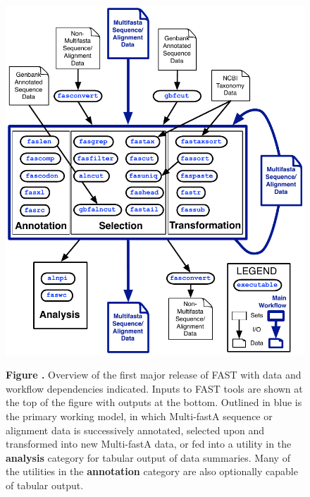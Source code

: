 \documentclass{frontiersSCNS} %
\begin{document}
\begin{figure}
\begin{center}
\includegraphics[width=4.5in]{FAST_v8}%
\end{center}
\textbf{\label{fig:01} Figure
  .}{ Overview of the first major release of FAST with
  data and workflow dependencies indicated.  Inputs to FAST tools are
  shown at the top of the figure with outputs at the bottom.  Outlined
  in blue is the primary working model, in which Multi-fastA sequence
  or alignment data is successively annotated, selected upon and
  transformed into new Multi-fastA data, or fed into a utility in the
  {\bf analysis} category for tabular output of data summaries. Many
  of the utilities in the {\bf annotation} category are also
  optionally capable of tabular output.}
\end{figure}
\end{document}
